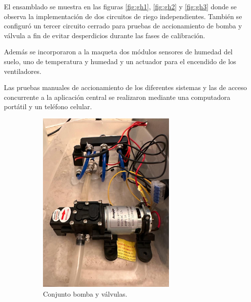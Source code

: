 El ensamblado se muestra en las figuras \ref{fig:gh1}, \ref{fig:gh2} y \ref{fig:gh3} donde se observa la implementación de dos circuitos de riego independientes. También se configuró un tercer circuito cerrado para pruebas de accionamiento de bomba y válvula a fin de evitar desperdicios durante las fases de calibración.



Además se incorporaron a la maqueta dos módulos sensores de humedad del suelo, uno de temperatura y humedad y un actuador para el encendido de los ventiladores.

Las pruebas manuales de accionamiento de los diferentes sistemas y las de acceso concurrente a la aplicación central se realizaron mediante una computadora portátil y un teléfono celular.

\begin{figure}[htpb]
     \centering
       \begin{subfigure}[b]{0.45\textwidth}
	    \centering
		 \includegraphics[width=0.75\textwidth]{./Figures/chapter4/pump_2.jpg}
		\caption{Conjunto bomba y válvulas.}
		\label{fig:pump}
     \end{subfigure}
          \hfill
     \begin{subfigure}[b]{0.45\textwidth}
		\centering

\end{subfigure}
\end{figure}
